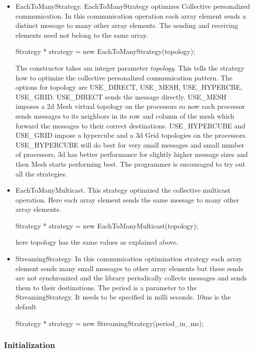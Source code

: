 \begin{itemize} 
\item EachToManyStrategy. EachToManyStrategy optimizes Collective 
personalized communication. In this communication operation each array
element sends a distinct message to many other array elements. The
sending and receiving elements need not belong to the same array.

Strategy * strategy = new EachToManyStrategy(topology);

The constructor takes am integer parameter {\em topology}. This tells
the strategy how to optimize the collective personalized communication
pattern. The options for topology are USE\_DIRECT, USE\_MESH,
USE\_HYPERCBE, USE\_GRID. USE\_DIRECT sends the message
directly. USE\_MESH imposes a 2d Mesh virtual topology on the
processors so now each processor sends messages to its neighbors in
its row and column of the mesh which forward the messages to their
correct destinations. USE\_HYPERCUBE and USE\_GRID impose a hypercube
and a 3d Grid topologies on the processors. USE\_HYPERCUBE will do
best for very small messages and small number of processors, 3d has
better performance for slightly higher message sizes and then Mesh
starts performing best. The programmer is encouraged to try out all
the strategies.

\item EachToManyMulticast. This strategy optimized the collective 
multicast operation. Here each array element sends the same message to
many other array elements.

Strategy * strategy = new EachToManyMulticast(topology);

here topology has the same values as explained above.

\item StreamingStrategy. In this communication optimization strategy 
each array element sends many small messages to other array elements
but these sends are not synchronized and the library periodically
collects messages and sends them to their destinations. The period is
a parameter to the StreamingStrategy. It needs to be specified in
milli seconds. 10ms is the default

Strategy * strategy = new StreamingStrategy(period\_in\_ms);

\end{itemize}

\subsubsection{Initialization}

